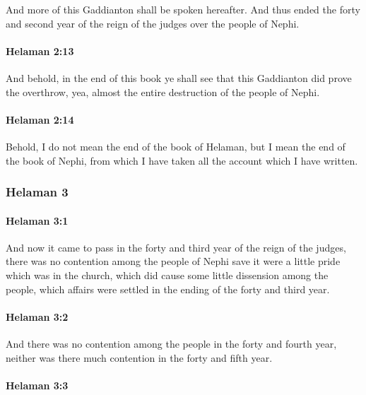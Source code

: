 			And more of this Gaddianton shall be spoken hereafter.
			And thus ended the forty and second year
			of the reign of the judges over the people of Nephi.

		\paragraph{Helaman 2:13} %
			\label{HELAMAN-2-13}

			And behold, in the end of this book
			ye shall see that this Gaddianton did prove the overthrow,
			yea, almost the entire destruction of the people of Nephi.

		\paragraph{Helaman 2:14} %
			\label{HELAMAN-2-14}

			Behold, I do not mean the end of the book of Helaman,
			but I mean the end of the book of Nephi,
			from which I have taken all the account which I have written.

	\subsubsection{Helaman 3} %
		\label{HELAMAN-3}
		
		\paragraph{Helaman 3:1} %
			\label{HELAMAN-3-1}

			And now it came to pass in the forty and third year of the reign of the judges,
			there was no contention among the people of Nephi
			save it were a little pride which was in the church,
			which did cause some little dissension among the people,
			which affairs were settled in the ending of the forty and third year.

		\paragraph{Helaman 3:2} %
			\label{HELAMAN-3-2}

			And there was no contention among the people in the forty and fourth year,
			neither was there much contention in the forty and fifth year.

		\paragraph{Helaman 3:3} %
			\label{HELAMAN-3-3}

